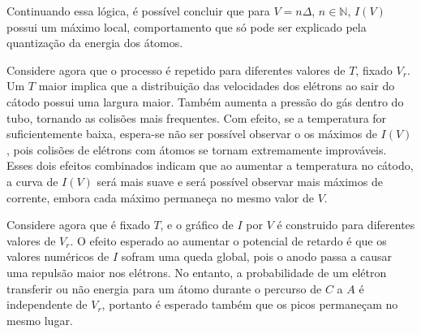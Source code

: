 Continuando essa lógica, é possível concluir que para $V = n\Delta$, $n \in \mathbb{N}$, $I(V)$ possui um máximo local,
comportamento que só pode ser explicado pela quantização da energia dos átomos. 

Considere agora que o processo é repetido para diferentes valores de $T$, fixado $V_r$. 
Um $T$ maior implica que a distribuição das velocidades dos elétrons ao sair do cátodo possui uma largura maior. 
Também aumenta a pressão do gás dentro do tubo, tornando as colisões mais frequentes.
Com efeito, se a temperatura for suficientemente baixa, espera-se não ser possível observar o os máximos de $I(V)$, pois 
colisões de elétrons com átomos se tornam extremamente improváveis.
Esses dois efeitos combinados indicam que ao aumentar a temperatura no cátodo, a curva de $I(V)$ será mais 
suave e será possível observar mais máximos de corrente, embora cada máximo permaneça no mesmo valor de $V$.

Considere agora que é fixado $T$, e o gráfico de $I$ por $V$ é construido para diferentes valores de $V_r$. 
O efeito esperado ao aumentar o potencial de retardo é que os valores numéricos de $I$ sofram uma queda global, 
pois o anodo passa a causar uma repulsão maior nos elétrons. 
No entanto, a probabilidade de um elétron transferir ou não energia para um átomo durante o percurso de $C$ a $A$ é independente de $V_r$, 
portanto é esperado também que os picos permaneçam no mesmo lugar. \cite{eisberg} \cite{tipler} \cite{roteiro}
